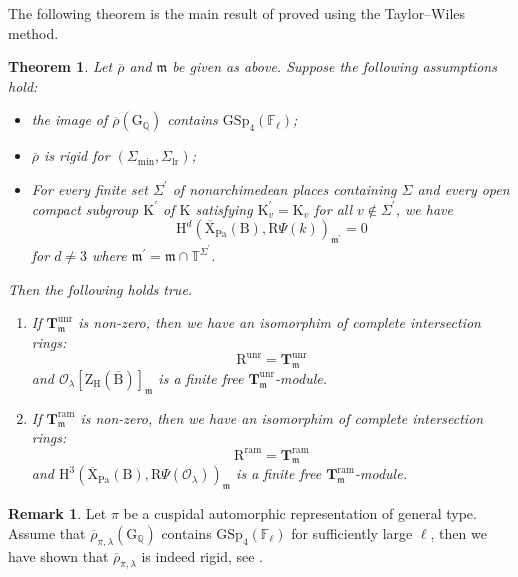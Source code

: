\documentclass[10pt]{amsart}
\numberwithin{equation}{section}
\newtheorem{theorem}[equation]{Theorem}
\theoremstyle{definition}
\newtheorem{remark}[equation]{Remark}
\def\GSp{\mathrm{GSp}}
\def\min{\mathrm{min}}
\def\lr{\mathrm{lr}}
\def\ram{\mathrm{ram}}
\def\Pa{\mathrm{Pa}}
\def\calO{\mathcal{O}}
\def\fracm{\mathfrak{m}}
\def\FF{\mathbb{F}}
\def\QQ{\mathbb{Q}}
\def\TT{\mathbb{T}}
\def\bfT{\mathbf{T}}
\def\rmB{\mathrm{B}}
\def\rmG{\mathrm{G}}
\def\rmH{\mathrm{H}}
\def\rmK{\mathrm{K}}
\def\rmR{\mathrm{R}}
\def\rmX{\mathrm{X}}
\def\rmZ{\mathrm{Z}}
\def\unr{\mathrm{unr}}
\begin{document}
The following theorem is the main result of \cite{Wangd} proved using the Taylor--Wiles method.
\begin{theorem}\label{Free}
Let $\overline{\rho}$ and $\fracm$ be given as above. Suppose the following assumptions hold:
\begin{itemize}
\item[(D1)] the image of $\overline{\rho}(\rmG_{\QQ})$ contains $\GSp_{4}(\FF_{\ell})$;
\item[(D2)] $\overline{\rho}$ is rigid for $(\Sigma_{\min}, \Sigma_{\lr})$;
\item[(D3)]  For every finite set $\Sigma^{\prime}$ of nonarchimedean places containing $\Sigma$ and every open compact subgroup $\rmK^{\prime}$ of $\rmK$ satisfying $\rmK^{\prime}_{v}=\rmK_{v}$ for all $v\not\in\Sigma^{\prime}$, we have 
\begin{equation*}
\rmH^{d}(\overline{\mathrm{X}}_{\Pa}(\rmB),\rmR\Psi (k))_{\fracm^{\prime}}=0
\end{equation*}
for $d\neq 3$ where $\fracm^{\prime}=\fracm\cap \TT^{\Sigma^{\prime}}$.
\end{itemize}
Then the following holds true.
\begin{enumerate}
\item If $\bfT^{\unr}_{\fracm}$ is non-zero, then we have an isomorphim of complete intersection rings: 
\begin{equation*}
\rmR^{\unr}=\bfT^{\unr}_{\fracm}
\end{equation*}
and $\calO_{\lambda}[\rmZ_{\rmH}(\overline{\rmB})]_{\fracm}$ is a finite free $\bfT^{\unr}_{\fracm}$-module.
\item  If $\bfT^{\ram}_{\fracm}$ is non-zero, then we have an isomorphim of complete intersection rings: 
\begin{equation*}
\rmR^{\ram}=\bfT^{\ram}_{\fracm}
\end{equation*}
 and $\rmH^{3}(\overline{\rmX}_{\Pa}(\rmB), \rmR\Psi(\calO_{\lambda}))_{\fracm}$ is a finite free $\bfT^{\ram}_{\fracm}$-module.
\end{enumerate}
\end{theorem}

\begin{remark}
Let $\pi$ be a cuspidal automorphic representation of general type. Assume that $\overline{\rho}_{\pi, \lambda}(\rmG_{\QQ})$ contains $\GSp_{4}(\FF_{\ell})$ for sufficiently large $\ell$, then we have shown that $\overline{\rho}_{\pi, \lambda}$ is indeed rigid, see \cite[Theorem 5.5]{Wangd}.  
\end{remark}
\end{document}
